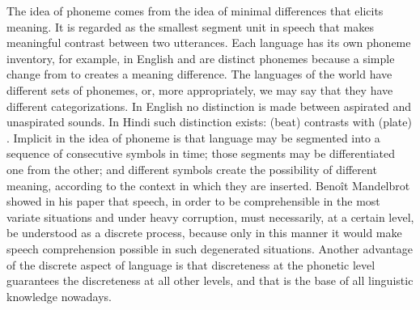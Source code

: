 The idea of phoneme comes from the idea of minimal differences that elicits meaning. It is regarded as the smallest segment unit in speech that makes meaningful contrast between two utterances. 
Each language has its own phoneme inventory, for example, in English  and  are distinct phonemes because a simple change from  to  creates a meaning difference. 
The languages of the world have different sets of phonemes, or, more appropriately, we may say that they have different categorizations. In English no distinction is made between aspirated and unaspirated sounds. 
In Hindi such distinction exists:  
(beat) contrasts with  (plate) \citep{ladefoged1996}. 
Implicit in the idea of phoneme is that language may be segmented into a sequence of consecutive symbols in time; those segments may be differentiated one from the other; and different symbols create the possibility of different meaning, according to the context in which they are inserted. 
Beno\^it Mandelbrot showed in his paper \citep{mandelbrot} that speech, in order to be comprehensible in the most variate situations and under heavy corruption, must necessarily, at a certain level, be understood as a discrete process, because only in this manner it would make speech comprehension possible in such degenerated situations. Another advantage of the discrete aspect of language is that discreteness at the phonetic level guarantees the discreteness at all other levels, and that is the base of all linguistic knowledge nowadays. 

